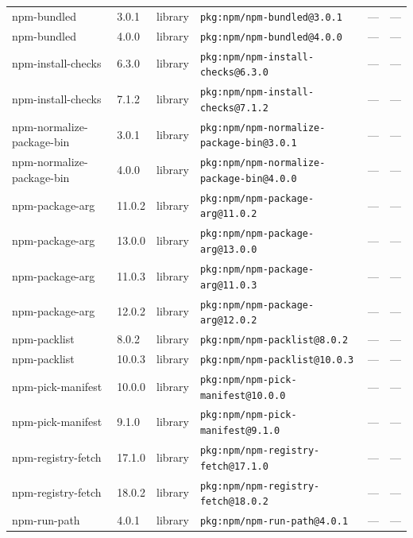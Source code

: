 \documentclass[11pt,a4paper]{article}
\begin{document}
\begin{longtable}{|p{4cm}|p{2cm}|p{1.6cm}|p{5cm}|p{1.5cm}|p{3.5cm}|}
\raggedright npm-bundled & 3.0.1 & library & \small\texttt{pkg:npm/npm-bundled@3.0.1} & — & \small — \\
\raggedright npm-bundled & 4.0.0 & library & \small\texttt{pkg:npm/npm-bundled@4.0.0} & — & \small — \\
\raggedright npm-install-checks & 6.3.0 & library & \small\texttt{pkg:npm/npm-install-checks@6.3.0} & — & \small — \\
\raggedright npm-install-checks & 7.1.2 & library & \small\texttt{pkg:npm/npm-install-checks@7.1.2} & — & \small — \\
\raggedright npm-normalize-package-bin & 3.0.1 & library & \small\texttt{pkg:npm/npm-normalize-package-bin@3.0.1} & — & \small — \\
\raggedright npm-normalize-package-bin & 4.0.0 & library & \small\texttt{pkg:npm/npm-normalize-package-bin@4.0.0} & — & \small — \\
\raggedright npm-package-arg & 11.0.2 & library & \small\texttt{pkg:npm/npm-package-arg@11.0.2} & — & \small — \\
\raggedright npm-package-arg & 13.0.0 & library & \small\texttt{pkg:npm/npm-package-arg@13.0.0} & — & \small — \\
\raggedright npm-package-arg & 11.0.3 & library & \small\texttt{pkg:npm/npm-package-arg@11.0.3} & — & \small — \\
\raggedright npm-package-arg & 12.0.2 & library & \small\texttt{pkg:npm/npm-package-arg@12.0.2} & — & \small — \\
\raggedright npm-packlist & 8.0.2 & library & \small\texttt{pkg:npm/npm-packlist@8.0.2} & — & \small — \\
\raggedright npm-packlist & 10.0.3 & library & \small\texttt{pkg:npm/npm-packlist@10.0.3} & — & \small — \\
\raggedright npm-pick-manifest & 10.0.0 & library & \small\texttt{pkg:npm/npm-pick-manifest@10.0.0} & — & \small — \\
\raggedright npm-pick-manifest & 9.1.0 & library & \small\texttt{pkg:npm/npm-pick-manifest@9.1.0} & — & \small — \\
\raggedright npm-registry-fetch & 17.1.0 & library & \small\texttt{pkg:npm/npm-registry-fetch@17.1.0} & — & \small — \\
\raggedright npm-registry-fetch & 18.0.2 & library & \small\texttt{pkg:npm/npm-registry-fetch@18.0.2} & — & \small — \\
\raggedright npm-run-path & 4.0.1 & library & \small\texttt{pkg:npm/npm-run-path@4.0.1} & — & \small — \\

\end{longtable}
\end{document}
